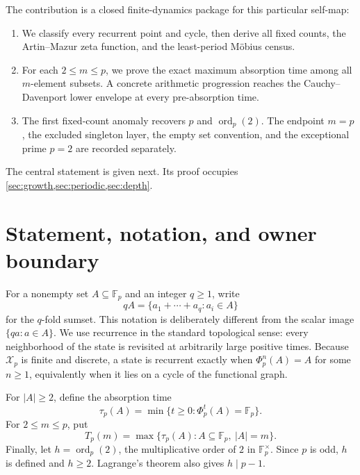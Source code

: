 \documentclass[11pt,a4paper]{amsart}
\theoremstyle{definition}
\theoremstyle{remark}
\newcommand{\Fp}{\mathbb F_p}
\newcommand{\ord}{\operatorname{ord}}
\newcommand{\card}[1]{\lvert #1\rvert}
\newcommand{\calX}{\mathcal X}
\begin{document}
The contribution is a closed finite-dynamics package for this particular
self-map:
\begin{enumerate}
\item We classify every recurrent point and cycle, then derive all fixed
  counts, the Artin--Mazur zeta function, and the least-period M\"obius
  census.
\item For each $2\leq m\leq p$, we prove the exact maximum absorption time
  among all $m$-element subsets.  A concrete arithmetic progression reaches
  the Cauchy--Davenport lower envelope at every pre-absorption time.
\item The first fixed-count anomaly recovers $p$ and
  $\ord_p(2)$.  The endpoint $m=p$, the excluded singleton layer, the empty
  set convention, and the exceptional prime $p=2$ are recorded separately.
\end{enumerate}

The central statement is given next.  Its proof occupies
\cref{sec:growth,sec:periodic,sec:depth}.

\section{Statement, notation, and owner boundary}

For a nonempty set $A\subseteq\Fp$ and an integer $q\geq1$, write
\[
 qA=\{a_1+\cdots+a_q:a_i\in A\}
\]
for the $q$-fold sumset.  This notation is deliberately different from the
scalar image $\{qa:a\in A\}$.  We use recurrence in the standard
topological sense: every neighborhood of the state is revisited at
arbitrarily large positive times.  Because $\calX_p$ is finite and
discrete, a state is recurrent exactly when $\Phi_p^n(A)=A$ for some
$n\geq1$, equivalently when it lies on a cycle of the functional graph.

For $\card A\geq2$, define the absorption time
\[
 \tau_p(A)=\min\{t\geq0:\Phi_p^t(A)=\Fp\}.
\]
For $2\leq m\leq p$, put
\[
 T_p(m)=\max\{\tau_p(A):A\subseteq\Fp,\ \card A=m\}.
\]
Finally, let $h=\ord_p(2)$, the multiplicative order of $2$ in
$\Fp^\times$.  Since $p$ is odd, $h$ is defined and $h\geq2$.
Lagrange's theorem also gives $h\mid p-1$.
\end{document}
